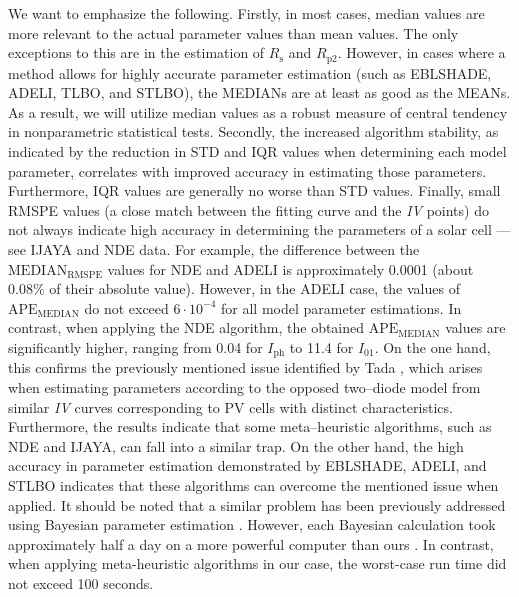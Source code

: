 \documentclass[a4paper,fleqn]{cas-sc}
\begin{document}
We want to emphasize the following.
Firstly, in most cases, median values are more relevant to the actual parameter values than mean values.
The only exceptions to this are in the estimation of $R_\mathrm{s}$ and $R_\mathrm{p2}$.
However, in cases where a method allows for highly accurate parameter estimation (such as EBLSHADE, ADELI, TLBO, and STLBO),
the MEDIANs are at least as good as the MEANs.
As a result, we will utilize median values as a robust measure of central tendency in nonparametric statistical tests.
Secondly, the increased algorithm stability, as indicated by the reduction in STD and IQR values
when determining each model parameter, correlates with improved accuracy in estimating those parameters.
Furthermore, IQR values are generally no worse than STD values.
Finally, small RMSPE values (a close match between the fitting curve and the \emph{IV} points)
do not always indicate high accuracy in determining the parameters of a solar cell --- see IJAYA and NDE data.
For example, the difference between the $\mathrm{MEDIAN}_\mathrm{RMSPE}$ values for NDE and ADELI is approximately 0.0001
(about 0.08\% of their absolute value).
However, in the ADELI case, the values of $\mathrm{APE}_\mathrm{MEDIAN}$ do not exceed $6\cdot 10^{-4}$
for all model parameter estimations.
In contrast, when applying the NDE algorithm, the obtained $\mathrm{APE}_\mathrm{MEDIAN}$ values are significantly higher,
ranging from 0.04 for $I_\mathrm{ph}$ to 11.4 for $I_{01}$.
On the one hand, this confirms the previously mentioned issue identified by Tada \cite{Tada2015Organic,Tada2021},
which arises when estimating parameters according to the opposed two--diode model from similar \emph{IV} curves
corresponding to PV cells with distinct characteristics.
Furthermore, the results indicate that some meta--heuristic algorithms, such as NDE and IJAYA, can fall into a similar trap.
On the other hand, the high accuracy in parameter estimation demonstrated by EBLSHADE, ADELI, and STLBO indicates
that these algorithms can overcome the mentioned issue when applied.
It should be noted that a similar problem has been previously addressed using Bayesian parameter estimation \cite{Tada2021}.
However, each Bayesian calculation took approximately half a day on a more powerful computer than ours \cite{Tada2021}.
In contrast, when applying meta-heuristic algorithms in our case, the worst-case run time did not exceed 100 seconds.
\end{document}
